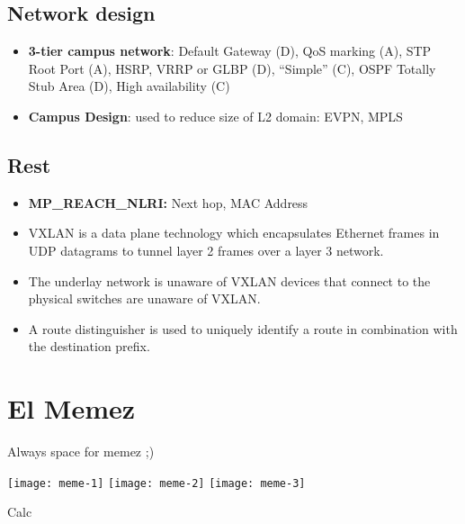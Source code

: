 \begin{multicols*}{5}
		\subsection{Network design}
		\begin{itemize}
			\item \textbf{3-tier campus network}: Default Gateway (D), QoS marking (A), STP Root Port (A), HSRP, VRRP or GLBP (D), “Simple” (C), OSPF Totally Stub Area (D), High availability (C)
			\item \textbf{Campus Design}: used to reduce size of L2 domain: EVPN, MPLS
		\end{itemize}
		\subsection{Rest}
		\begin{itemize}
			\item \textbf{MP\_REACH\_NLRI:} Next hop, MAC Address
			\item VXLAN is a data plane technology which encapsulates Ethernet frames in UDP datagrams to tunnel layer 2 frames over a layer 3 network.
			\item The underlay network is unaware of VXLAN devices that connect to the physical switches are unaware of VXLAN. 
			\item A route distinguisher is used to uniquely identify a route in combination with the destination prefix.
		\end{itemize}
		\section{El Memez}
		Always space for memez ;)
		\begin{center}
			\texttt{[image: meme-1]}
			\texttt{[image: meme-2]}
			\texttt{[image: meme-3]}
		\end{center}
		Calc
		
	\end{multicols*}
	
	
 